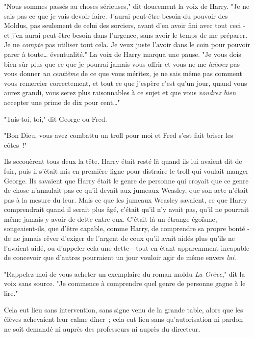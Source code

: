 "Nous sommes passés au choses sérieuses," dit doucement la voix de Harry. "Je ne sais pas ce que je vais devoir faire. J'aurai peut-être besoin du pouvoir des Moldus, pas seulement de celui des sorciers, avant d'en avoir fini avec tout ceci - et j'en aurai peut-être besoin dans l'urgence, sans avoir le temps de me préparer. Je ne \emph{compte} pas utiliser tout cela. Je veux juste l'avoir dans le coin pour pouvoir parer à toute… éventualité." La voix de Harry marqua une pause. "Je vous dois bien sûr plus que ce que je pourrai jamais vous offrir et vous ne me \emph{laissez} pas vous donner \emph{un centième} de ce que vous méritez, je ne sais même pas comment vous remercier correctement, et tout ce que j'espère c'est qu'un jour, quand vous aurez grandi, vous serez plus raisonnables à ce sujet et que vous \emph{voudrez bien} accepter une prime de dix pour cent…"

"Tais-toi, toi," dit George ou Fred.

"Bon Dieu, vous avez combattu un troll pour moi et Fred s'est fait briser les côtes~!"

Ils secouèrent tous deux la tête. Harry était resté là quand ils lui avaient dit de fuir, puis il s'était mis en première ligne pour distraire le troll qui voulait manger George. Ils savaient que Harry était le genre de personne qui croyait que ce genre de chose n'annulait pas ce qu'il devait aux jumeaux Weasley, que son acte n'était pas à la mesure du leur. Mais ce que les jumeaux Weasley savaient, ce que Harry comprendrait quand il serait plus âgé, c'était qu'il n'y avait pas, qu'il ne pourrait même jamais y avoir de dette entre eux. C'était là un étrange égoïsme, songeaient-ils, que d'être capable, comme Harry, de comprendre sa propre bonté - de ne jamais rêver d'exiger de l'argent de ceux qu'il avait aidés plus qu'ils ne l'avaient aidé, ou d'appeler cela une dette - tout en étant apparemment incapable de concevoir que d'autres pourraient un jour vouloir agir de même envers \emph{lui}.

"Rappelez-moi de vous acheter un exemplaire du roman moldu \emph{La Grève}," dit la voix sans source. "Je commence à comprendre quel genre de personne gagne à le lire."


Cela eut lieu sans intervention, sans signe venu de la grande table, alors que les élèves achevaient leur calme dîner~; cela eut lieu sans qu'autorisation ni pardon ne soit demandé ni auprès des professeurs ni auprès du directeur.

